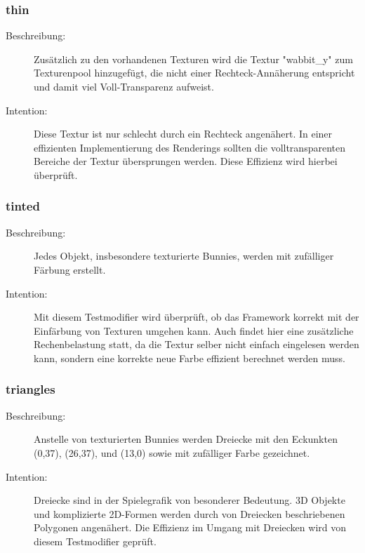\subsubsection{thin}
\begin{description}
\item[Beschreibung:] Zusätzlich zu den vorhandenen Texturen wird die Textur "wabbit\_y" zum Texturenpool hinzugefügt, die nicht einer Rechteck-Annäherung entspricht und damit viel Voll-Transparenz aufweist. \\
\item[Intention:] Diese Textur ist nur schlecht durch ein Rechteck angenähert. In einer effizienten Implementierung des Renderings sollten die volltransparenten Bereiche der Textur übersprungen werden. Diese Effizienz wird hierbei überprüft.
\end{description}

\subsubsection{tinted}
\begin{description}
\item[Beschreibung:] Jedes Objekt, insbesondere texturierte Bunnies, werden mit zufälliger Färbung erstellt. \\
\item[Intention:] Mit diesem Testmodifier wird überprüft, ob das Framework korrekt mit der Einfärbung von Texturen umgehen kann. Auch findet hier eine zusätzliche Rechenbelastung statt, da die Textur selber nicht einfach eingelesen werden kann, sondern eine korrekte neue Farbe effizient berechnet werden muss.
\end{description}

\subsubsection{triangles}
\begin{description}
\item[Beschreibung:] Anstelle von texturierten Bunnies werden Dreiecke mit den Eckunkten (0,37), (26,37), und (13,0) sowie mit zufälliger Farbe gezeichnet. \\
\item[Intention:] Dreiecke sind in der Spielegrafik von besonderer Bedeutung. 3D Objekte und komplizierte 2D-Formen werden durch von Dreiecken beschriebenen Polygonen angenähert. Die Effizienz im Umgang mit Dreiecken wird von diesem Testmodifier geprüft.
\end{description}

